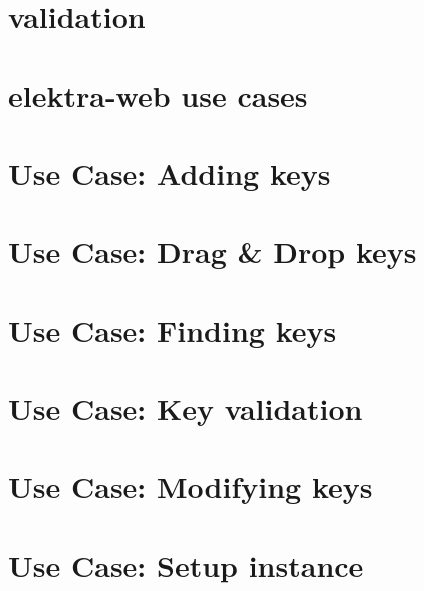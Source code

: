 \documentclass[twoside]{book}
\newcommand{\+}{\discretionary{\mbox{\scriptsize$\hookleftarrow$}}{}{}}
\begin{document}
\chapter{validation}
\label{md_doc_tutorials_validation}

\chapter{elektra-\/web use cases}
\label{doc_usecases_elektra_web_README_md}

\chapter{Use Case\+: Adding keys}
\label{doc_usecases_elektra_web_UC_adding_keys_md}

\chapter{Use Case\+: Drag \& Drop keys}
\label{doc_usecases_elektra_web_UC_drag_n_drop_md}

\chapter{Use Case\+: Finding keys}
\label{doc_usecases_elektra_web_UC_finding_keys_md}

\chapter{Use Case\+: Key validation}
\label{doc_usecases_elektra_web_UC_key_validation_md}

\chapter{Use Case\+: Modifying keys}
\label{doc_usecases_elektra_web_UC_modifying_keys_md}

\chapter{Use Case\+: Setup instance}
\label{doc_usecases_elektra_web_UC_setup_instance_md}

\end{document}
